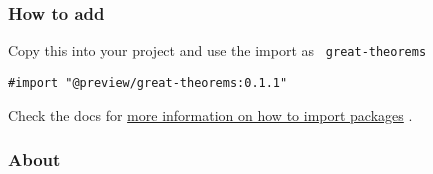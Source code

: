 \subsubsection{How to add}\label{how-to-add}

Copy this into your project and use the import as
\texttt{\ great-theorems\ }

\begin{verbatim}
#import "@preview/great-theorems:0.1.1"
\end{verbatim}



Check the docs for
\href{https://typst.app/docs/reference/scripting/\#packages}{more
information on how to import packages} .

\subsubsection{About}\label{about}

